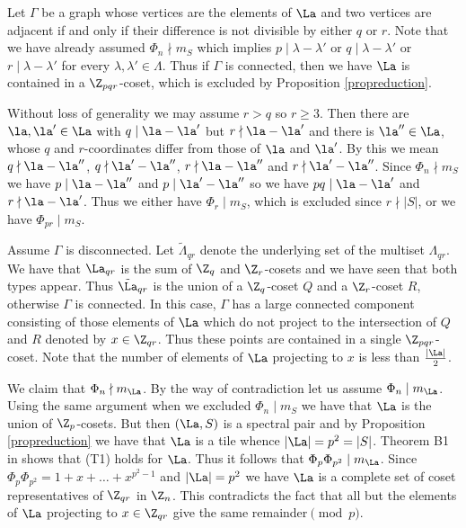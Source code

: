         Let $\Gamma$ be a graph whose vertices are the elements of $\La$ and two vertices are adjacent if and only if their difference is not divisible by either $q$ or $r$. 
        Note that we have already assumed $\Phi_n \nmid m_S$ which implies $p \mid \lambda-\lambda '$ or $q \mid
        \lambda-\lambda '$ or $r \mid \lambda-\lambda '$ for every
        $\lambda, \lambda ' \in \Lambda$.
        Thus if $\Gamma$ is connected, then we have $\La$ is contained in a $\Z_{pqr}$-coset, which is excluded by Proposition \ref{propreduction}. 
        
        
        Without loss of generality we may assume $r>q$ so $r\ge 3$. 
        Then there are $\la, \la' \in  \La$ with  $q \mid \la-\la'$ but  $r \nmid \la-\la'$ and there is $\la'' \in \La$, whose $q$ and $r$-coordinates differ from those of $\la$ and $\la'$. By this we mean $q \nmid \la-\la''$, $q \nmid \la'-\la''$, $r \nmid \la-\la''$ and $r \nmid \la'-\la''$. 
        Since $\Phi_n \nmid m_S$ we have $p  \mid \la-\la''$ and $p  \mid \la'-\la''$ so we have $pq  \mid \la-\la'$ and $r \nmid \la-\la'$. 
        Thus we either have $\Phi_r \mid m_S$, which is excluded since $r \nmid |S|$, or we have $\Phi_{pr} \mid m_S$. 
        
        
        Assume $\Gamma$ is disconnected. Let $\tilde{\Lambda}_{qr}$ denote the underlying set of the multiset $\Lambda_{qr}$. We have that $\La_{qr}$ is the sum of $\Z_q$ and $\Z_r$-cosets and we have seen that  both types appear. Thus $\tilde{\La}_{qr}$ is the union of a $\Z_q$-coset $Q$ and a $\Z_r$-coset $R$, otherwise $\Gamma$ is connected. 
        In this case, $\Gamma$ has a large connected component consisting of those elements of $\La$ which do not project to the
        intersection of $Q$ and $R$ denoted by $x \in \Z_{qr}$. Thus these points are contained in a single $\Z_{pqr}$-coset. Note that the number of elements of $\La$ projecting to $x$ is less than $\frac{|\La|}{2}$.
        
        We claim that $\Phi_n \nmid m_{\La}$. By the way of contradiction let us assume $\Phi_n \mid m_{\La}$. Using the same argument when we excluded $\Phi_n \mid m_S$ we have that $\La$ is the union of $\Z_p$-cosets. But then $(\La,S)$ is a spectral pair and by Proposition \ref{propreduction} we have that $\La$ is a tile whence $|\La|=p^2=|S|$. 
         Theorem B1 in \cite{cm} shows that (T1) holds for $\La$. Thus it follows that $\Phi_p \Phi_{p^2} \mid m_{\La}$. Since $\Phi_p \Phi_{p^2}=1+x+ \ldots +x^{p^2-1}$ and $|\La|=p^2$ we have $\La$ is a complete set of coset representatives of $\Z_{qr}$ in $\Z_n$. This contradicts the fact that all but the elements of $\La$ projecting to $x \in \Z_{qr}$ give the same remainder$\pmod{p}$. 
        
